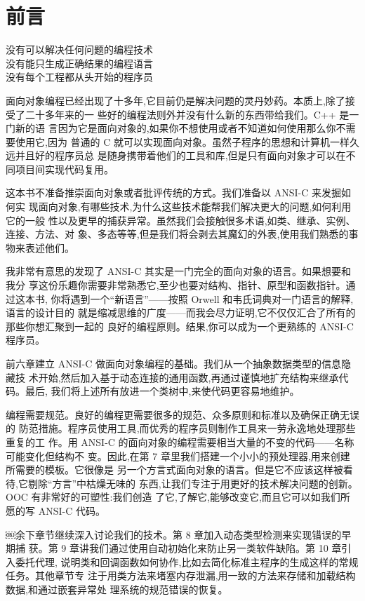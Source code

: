 \chapter{前言}

\begin{flushright}
没有可以解决任何问题的编程技术\\
没有能只生成正确结果的编程语言\\
没有每个工程都从头开始的程序员\\
\end{flushright}


面向对象编程已经出现了十多年,它目前仍是解决问题的灵丹妙药。本质上,除了接 受了二十多年来的一
些好的编程法则外并没有什么新的东西带给我们。C++ 是一门新的语 言因为它是面向对象的,如果你不想使用或者不知道如何使用那么你不需要使用它,因为 普通的 C 就可以实现面向对象。虽然子程序的思想和计算机一样久远并且好的程序员总 是随身携带着他们的工具和库,但是只有面向对象才可以在不同项目间实现代码复用。

这本书不准备推崇面向对象或者批评传统的方式。我们准备以 ANSI-C 来发掘如何实 现面向对象,有哪些技术,为什么这些技术能帮我们解决更大的问题,如何利用它的一般 性以及更早的捕获异常。虽然我们会接触很多术语,如类、继承、实例、连接、方法、对 象、多态等等,但是我们将会剥去其魔幻的外表,使用我们熟悉的事物来表述他们。


我非常有意思的发现了 ANSI-C 其实是一门完全的面向对象的语言。如果想要和我分 享这份乐趣你需要非常熟悉它,至少也要对结构、指针、原型和函数指针。通过这本书, 你将遇到一个“新语言”——按照 Orwell 和韦氏词典对一门语言的解释,语言的设计目的 就是缩减思维的广度——而我会尽力证明,它不仅仅汇合了所有的那些你想汇聚到一起的 良好的编程原则。结果,你可以成为一个更熟练的 ANSI-C 程序员。


前六章建立 ANSI-C 做面向对象编程的基础。我们从一个抽象数据类型的信息隐藏技 术开始,然后加入基于动态连接的通用函数,再通过谨慎地扩充结构来继承代码。最后, 我们将上述所有放进一个类树中,来使代码更容易地维护。


编程需要规范。良好的编程更需要很多的规范、众多原则和标准以及确保正确无误的 防范措施。程序员使用工具,而优秀的程序员则制作工具来一劳永逸地处理那些重复的工 作。用 ANSI-C 的面向对象的编程需要相当大量的不变的代码——名称可能变化但结构不 变。因此,在第 7 章里我们搭建一个小小的预处理器,用来创建所需要的模板。它很像是 另一个方言式面向对象的语言。但是它不应该这样被看待,它剔除“方言”中枯燥无味的 东西,让我们专注于用更好的技术解决问题的创新。OOC 有非常好的可塑性:我们创造 了它,了解它,能够改变它,而且它可以如我们所愿的写 ANSI-C 代码。

￼余下章节继续深入讨论我们的技术。第 8 章加入动态类型检测来实现错误的早期捕 获。第 9 章讲我们通过使用自动初始化来防止另一类软件缺陷。第 10 章引入委托代理, 说明类和回调函数如何协作,比如去简化标准主程序的生成这样的常规任务。其他章节专 注于用类方法来堵塞内存泄漏,用一致的方法来存储和加载结构数据,和通过嵌套异常处 理系统的规范错误的恢复。

